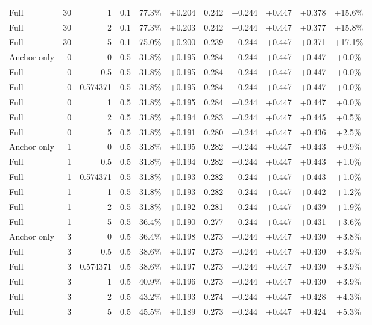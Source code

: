 \begin{table}[htbp]
\begin{tabular}{lrrrccccccc}
Full & 30 & 1 & 0.1 & 77.3\% & +0.204 & 0.242 & +0.244 & +0.447 & +0.378 & +15.6\% \\
Full & 30 & 2 & 0.1 & 77.3\% & +0.203 & 0.242 & +0.244 & +0.447 & +0.377 & +15.8\% \\
Full & 30 & 5 & 0.1 & 75.0\% & +0.200 & 0.239 & +0.244 & +0.447 & +0.371 & +17.1\% \\
Anchor only & 0 & 0 & 0.5 & 31.8\% & +0.195 & 0.284 & +0.244 & +0.447 & +0.447 & +0.0\% \\
Full & 0 & 0.5 & 0.5 & 31.8\% & +0.195 & 0.284 & +0.244 & +0.447 & +0.447 & +0.0\% \\
Full & 0 & 0.574371 & 0.5 & 31.8\% & +0.195 & 0.284 & +0.244 & +0.447 & +0.447 & +0.0\% \\
Full & 0 & 1 & 0.5 & 31.8\% & +0.195 & 0.284 & +0.244 & +0.447 & +0.447 & +0.0\% \\
Full & 0 & 2 & 0.5 & 31.8\% & +0.194 & 0.283 & +0.244 & +0.447 & +0.445 & +0.5\% \\
Full & 0 & 5 & 0.5 & 31.8\% & +0.191 & 0.280 & +0.244 & +0.447 & +0.436 & +2.5\% \\
Anchor only & 1 & 0 & 0.5 & 31.8\% & +0.195 & 0.282 & +0.244 & +0.447 & +0.443 & +0.9\% \\
Full & 1 & 0.5 & 0.5 & 31.8\% & +0.194 & 0.282 & +0.244 & +0.447 & +0.443 & +1.0\% \\
Full & 1 & 0.574371 & 0.5 & 31.8\% & +0.193 & 0.282 & +0.244 & +0.447 & +0.443 & +1.0\% \\
Full & 1 & 1 & 0.5 & 31.8\% & +0.193 & 0.282 & +0.244 & +0.447 & +0.442 & +1.2\% \\
Full & 1 & 2 & 0.5 & 31.8\% & +0.192 & 0.281 & +0.244 & +0.447 & +0.439 & +1.9\% \\
Full & 1 & 5 & 0.5 & 36.4\% & +0.190 & 0.277 & +0.244 & +0.447 & +0.431 & +3.6\% \\
Anchor only & 3 & 0 & 0.5 & 36.4\% & +0.198 & 0.273 & +0.244 & +0.447 & +0.430 & +3.8\% \\
Full & 3 & 0.5 & 0.5 & 38.6\% & +0.197 & 0.273 & +0.244 & +0.447 & +0.430 & +3.9\% \\
Full & 3 & 0.574371 & 0.5 & 38.6\% & +0.197 & 0.273 & +0.244 & +0.447 & +0.430 & +3.9\% \\
Full & 3 & 1 & 0.5 & 40.9\% & +0.196 & 0.273 & +0.244 & +0.447 & +0.430 & +3.9\% \\
Full & 3 & 2 & 0.5 & 43.2\% & +0.193 & 0.274 & +0.244 & +0.447 & +0.428 & +4.3\% \\
Full & 3 & 5 & 0.5 & 45.5\% & +0.189 & 0.273 & +0.244 & +0.447 & +0.424 & +5.3\% \\

\end{tabular}
\end{table}
